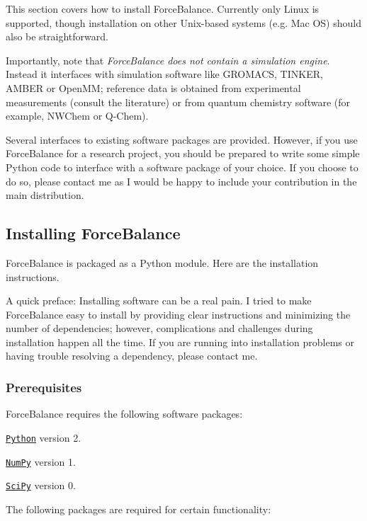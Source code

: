This section covers how to install Force\-Balance. Currently only Linux is supported, though installation on other Unix-\/based systems (e.\-g. Mac O\-S) should also be straightforward.

Importantly, note that {\itshape Force\-Balance does not contain a simulation engine}. Instead it interfaces with simulation software like G\-R\-O\-M\-A\-C\-S, T\-I\-N\-K\-E\-R, A\-M\-B\-E\-R or Open\-M\-M; reference data is obtained from experimental measurements (consult the literature) or from quantum chemistry software (for example, N\-W\-Chem or Q-\/\-Chem).

Several interfaces to existing software packages are provided. However, if you use Force\-Balance for a research project, you should be prepared to write some simple Python code to interface with a software package of your choice. If you choose to do so, please contact me as I would be happy to include your contribution in the main distribution.\hypertarget{installation_installing_forcebalance}{}\subsection{Installing Force\-Balance}\label{installation_installing_forcebalance}
Force\-Balance is packaged as a Python module. Here are the installation instructions.

A quick preface\-: Installing software can be a real pain. I tried to make Force\-Balance easy to install by providing clear instructions and minimizing the number of dependencies; however, complications and challenges during installation happen all the time. If you are running into installation problems or having trouble resolving a dependency, please contact me.\hypertarget{installation_installing_forcebalance_prereq}{}\subsubsection{Prerequisites}\label{installation_installing_forcebalance_prereq}
Force\-Balance requires the following software packages\-:

\begin{DoxyItemize}
\item \href{http://www.python.org/}{\tt Python} version 2. \item \href{http://numpy.scipy.org/}{\tt Num\-Py} version 1. \item \href{http://www.scipy.org/}{\tt Sci\-Py} version 0.\end{DoxyItemize}
The following packages are required for certain functionality\-:

